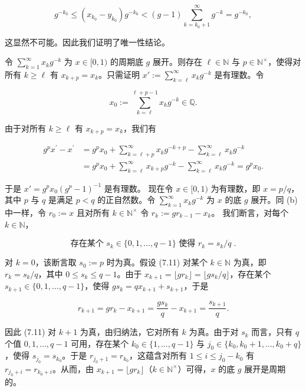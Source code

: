 \begin{theorem}
\begin{items}
\[
g^{-k_{0}}\leq(x_{k_{0}}-y_{k_{0}})g^{-k_{0}}<(g-1)\sum_{k=k_{0}+1}^{\infty}g^{-k}=g^{-k_{0}},
\]

这显然不可能。因此我们证明了唯一性结论。

\item

令 $ \sum_{k=1}^{\infty} x_k g^{-k} $ 为 $ x \in [0,1) $ 的周期底 $ g $ 展开。则存在 $ \ell \in \mathbb{N} $ 与 $ p \in \mathbb{N}^\times $，使得对所有 $ k \geq \ell $ 有 $ x_{k+p} = x_k $。只需证明 $ x' := \sum_{k=\ell}^{\infty} x_k g^{-k} $ 是有理数。令

\[
x_{0}:=\sum_{k=\ell}^{\ell+p-1}x_{k}g^{-k}\in\mathbb{Q}.
\]

由于对所有 $ k \geq \ell $ 有 $ x_{k+p} = x_k $，我们有

\begin{equation*}
\begin{aligned}
g^{p}x^{\prime}-x^{\prime}&=g^{p}x_{0}+\sum_{k=\ell+p}^{\infty}x_{k}g^{-k+p}-\sum_{k=\ell}^{\infty}x_{k}g^{-k}\\&=g^{p}x_{0}+\sum_{k=\ell}^{\infty}x_{k+p}g^{-k}-\sum_{k=\ell}^{\infty}x_{k}g^{-k}=g^{p}x_{0}.
\end{aligned}
\end{equation*}

于是 $ x' = g^p x_0 (g^p - 1)^{-1} $ 是有理数。
现在令 $ x \in [0,1) $ 为有理数，即 $ x = p/q $，其中 $ p $ 与 $ q $ 是满足 $ p < q $ 的正自然数。令 $ \sum_{k=1}^{\infty} x_k g^{-k} $ 为 $ x $ 的底 $ g $ 展开。同 (b) 中一样，令 $ r_0 := x $ 且对所有 $ k \in \mathbb{N}^\times $ 令 $ r_k := gr_{k-1} - x_k $。
我们断言，对每个 $ k \in \mathbb{N} $，

\begin{equation}
\text{存在某个 }s_{k}\in\{0,1,\ldots,q-1\}\text{ 使得 }r_{k}=s_{k}/q\;.
\end{equation}

对 $k=0$，该断言取 $s_0:=p$ 时为真。假设 (7.11) 对某个 $k\in\mathbb{N}$ 为真，即 $r_k=s_k/q$，其中 $0\leq s_k\leq q-1$。由于 $x_{k+1}=\lfloor gr_k\rfloor=\lfloor gs_k/q\rfloor$，存在某个 $s_{k+1}\in\{0,1,\ldots,q-1\}$，使得 $gs_k=qx_{k+1}+s_{k+1}$，于是

\[
r_{k+1}=g r_{k}-x_{k+1}=\frac{g s_{k}}{q}-x_{k+1}=\frac{s_{k+1}}{q}.
\]

因此 (7.11) 对 $ k+1 $ 为真，由归纳法，它对所有 $ k $ 为真。由于对 $ s_k $ 而言，只有 $ q $ 个值 $ 0,1,\ldots,q-1 $ 可用，存在某个 $ k_0\in\{1,\ldots,q-1\} $ 与 $ j_0\in\{k_0,k_0+1,\ldots,k_0+q\} $，使得 $ s_{j_0}=s_{k_0} $。于是 $ r_{j_0+1}=r_{k_0} $，这蕴含对所有 $ 1\leq i\leq j_0-k_0 $ 有 $ r_{j_0+i}=r_{k_0+i} $。从而，由 $ x_{k+1}=\lfloor gr_k\rfloor $（$ k\in\mathbb{N}^\times $）可得，$ x $ 的底 $ g $ 展开是周期的。

\end{items}

\end{theorem}

